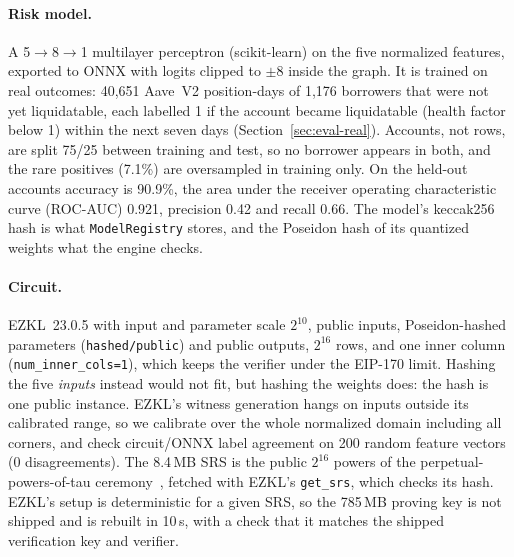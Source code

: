 \documentclass[sigconf,nonacm]{acmart}
\newcommand{\code}[1]{\texttt{\smaller #1}}
\begin{document}
\paragraph{Risk model.} A 5$\to$8$\to$1 multilayer perceptron (scikit-learn) on the five normalized features, exported to ONNX with logits clipped to $\pm8$ inside the graph. It is trained on real outcomes: 40,651 Aave~V2 position-days of 1,176 borrowers that were not yet liquidatable, each labelled 1 if the account became liquidatable (health factor below 1) within the next seven days (Section~\ref{sec:eval-real}). Accounts, not rows, are split 75/25 between training and test, so no borrower appears in both, and the rare positives (7.1\%) are oversampled in training only. On the held-out accounts accuracy is 90.9\%, the area under the receiver operating characteristic curve (ROC-AUC) 0.921, precision 0.42 and recall 0.66. The model's keccak256 hash is what \code{ModelRegistry} stores, and the Poseidon hash of its quantized weights what the engine checks.

\paragraph{Circuit.} EZKL~23.0.5 with input and parameter scale $2^{10}$, public inputs, Poseidon-hashed parameters (\code{hashed/public}) and public outputs, $2^{16}$ rows, and one inner column (\code{num\_inner\_cols=1}), which keeps the verifier under the EIP-170 limit. Hashing the five \emph{inputs} instead would not fit, but hashing the weights does: the hash is one public instance. EZKL's witness generation hangs on inputs outside its calibrated range, so we calibrate over the whole normalized domain including all corners, and check circuit/ONNX label agreement on 200 random feature vectors (0 disagreements). The 8.4\,MB SRS is the public $2^{16}$ powers of the perpetual-powers-of-tau ceremony~\cite{ezkl}, fetched with EZKL's \code{get\_srs}, which checks its hash. EZKL's setup is deterministic for a given SRS, so the 785\,MB proving key is not shipped and is rebuilt in 10\,s, with a check that it matches the shipped verification key and verifier.
\end{document}
